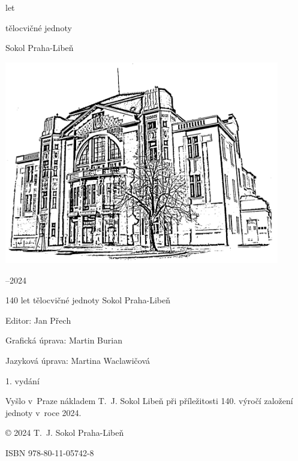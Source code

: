 \documentclass[a5paper, 11pt, twoside]{article}
\newcommand{\titlesize}{\fontsize{36pt}{54pt}}
\begin{document}
\begin{center}
  \setlength{\parskip}{6pt}
  \vspace*{18pt}
  {\fontsize{56pt}{66pt} let}

  {\titlesize\tyrs tělocvičné jednoty}
  
  {\titlesize\tyrs Sokol Praha-Libeň}

  \vspace*{\fill}

    \includegraphics*[width=0.9\textwidth]{./Sokolovna-kresba-black.png}

  \vspace*{\fill}

  {\titlesize{}–2024}
  \vspace*{-1cm}
\end{center}

\mbox{}
\clearpage

\vspace*{\fill}
{ \parindent0pt \parskip3pt
140 let tělocvičné jednoty Sokol Praha-Libeň

Editor: Jan Přech 

Grafická úprava: Martin Burian 

Jazyková úprava: Martina Waclawičová

1. vydání 

Vyšlo v~Praze nákladem T.~J. Sokol Libeň při příležitosti 140. výročí založení jednoty v~roce 2024.

© 2024 T.~J. Sokol Praha-Libeň

ISBN 978-80-11-05742-8
}
\clearpage


\tableofcontents
\end{document}
